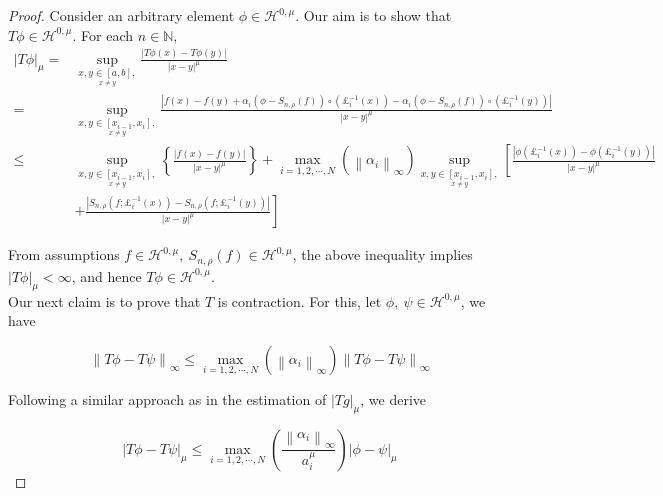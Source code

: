 \documentclass[10pt,a4paper]{amsart}
\begin{document}
	\begin{proof}
		
		Consider an arbitrary element $\phi \in \mathcal{H}^{0,\mu}$. Our aim is to show that $T\phi \in \mathcal{H}^{0,\mu} $. For each $n \in \mathbb{N}$,
		\begin{align*}
			|T \phi|_{\mu}= & \sup _{\underset{x \neq y}{x, y \in [a,b],}} \frac{|T \phi(x)-T \phi(y)|}{|x-y|^{\mu}} \\
			= & \sup _{\underset{x \neq y}{x, y \in [x_{i-1},x_i], }} \frac{\left|f(x)-f(y)+\alpha_{i}\left(\phi-S_{n,\rho}(f)\right) \circ\left(\pounds_{i}^{-1}(x)\right)-\alpha_{i}\left(\phi-S_{n,\rho}(f)\right) \circ\left(\pounds_{i}^{-1}(y)\right)\right|}{|x-y|^{\mu}} \\
			\leq & \sup _{\underset{x \neq y}{x, y \in [x_{i-1},x_i], }}\left\{\frac{|f(x)-f(y)|}{|x-y|^{\mu}}\right\}+\max _{i =1,2,\cdots,N}\left(\left\|\alpha_{i}\right\|_{\infty}\right) \sup _{\underset{x \neq y}{x, y \in [x_{i-1},x_i], }}\left[\frac{\left|\phi\left(\pounds_{i}^{-1}(x)\right)-\phi\left(\pounds_{i}^{-1}(y)\right)\right|}{|x-y|^{\mu}}\right. \\
			& \left.+\frac{\left|S_{n,\rho}\left(f ; \pounds_{i}^{-1}(x)\right)-S_{n,\rho}\left(f ; \pounds_{i}^{-1}(y)\right)\right|}{|x-y|^{\mu}}\right]
		\end{align*}
		
		
		From assumptions $f \in \mathcal{H}^{0,\mu},~ S_{n,\rho}(f) \in \mathcal{H}^{0,\mu}$, the above inequality implies $|T \phi|_{\mu}<\infty$, and hence $T \phi \in \mathcal{H}^{0,\mu}$.\\
		Our next claim is to prove that $T$ is contraction. For this, let $\phi,~ \psi \in \mathcal{H}^{0,\mu}$, we have
		
		\begin{equation}\label{10}
			\left\|T\phi - T\psi\right\|_{\infty} \leq \max _{i =1,2,\cdots,N}\left(\left\|\alpha_{i}\right\|_{\infty}\right)\left\|T\phi - T\psi\right\|_{\infty}
		\end{equation}
		
		
		Following a similar approach as in the estimation of $|T g|_{\mu}$, we derive
		
		\begin{equation}\label{11}
			\left|T\phi - T\psi\right|_{\mu} \leq \max _{i =1,2,\cdots,N}\left(\frac{\left\|\alpha_{i}\right\|_{\infty}}{a_{i}^{\mu}}\right)\left|\phi - \psi\right|_{\mu}
		\end{equation}
		

\end{proof}
\end{document}
